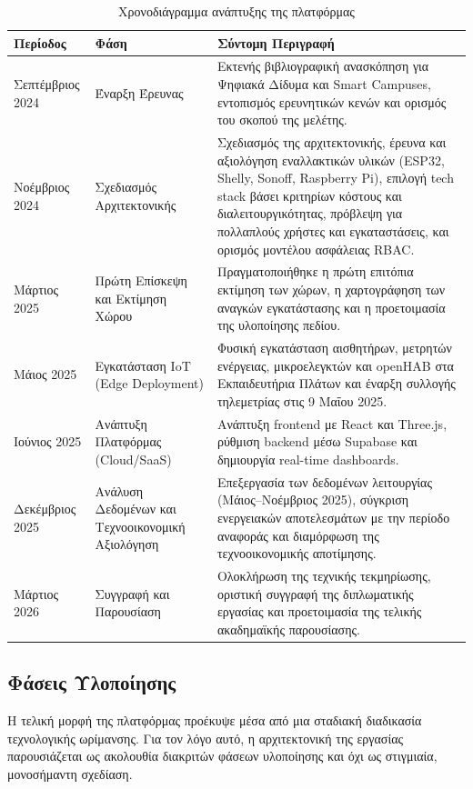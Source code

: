 \begin{table}[htbp]
\centering
\small
\setlength{\tabcolsep}{4pt}
\renewcommand{\arraystretch}{1.15}
\caption{Χρονοδιάγραμμα ανάπτυξης της πλατφόρμας}
\label{tab:timeline_ch3}
\begin{tabular}{|p{}|p{}|p{}|}
\hline
\textbf{Περίοδος} & \textbf{Φάση} & \textbf{Σύντομη Περιγραφή} \\
\hline
Σεπτέμβριος 2024 & Έναρξη Έρευνας & Εκτενής βιβλιογραφική ανασκόπηση για Ψηφιακά Δίδυμα και \textlatin{Smart Campuses}, εντοπισμός ερευνητικών κενών και ορισμός του σκοπού της μελέτης. \\
\hline
Νοέμβριος 2024 & Σχεδιασμός Αρχιτεκτονικής & Σχεδιασμός της αρχιτεκτονικής, έρευνα και αξιολόγηση εναλλακτικών υλικών (\textlatin{ESP32, Shelly, Sonoff, Raspberry Pi}), επιλογή \textlatin{tech stack} βάσει κριτηρίων κόστους και διαλειτουργικότητας, πρόβλεψη για πολλαπλούς χρήστες και εγκαταστάσεις, και ορισμός μοντέλου ασφάλειας \textlatin{RBAC}. \\
\hline
Μάρτιος 2025 & Πρώτη Επίσκεψη και Εκτίμηση Χώρου & Πραγματοποιήθηκε η πρώτη επιτόπια εκτίμηση των χώρων, η χαρτογράφηση των αναγκών εγκατάστασης και η προετοιμασία της υλοποίησης πεδίου. \\
\hline
Μάιος 2025 & Εγκατάσταση \textlatin{IoT} (\textlatin{Edge Deployment}) & Φυσική εγκατάσταση αισθητήρων, μετρητών ενέργειας, μικροελεγκτών και \textlatin{openHAB} στα Εκπαιδευτήρια Πλάτων και έναρξη συλλογής τηλεμετρίας στις 9 Μαΐου 2025. \\
\hline
Ιούνιος 2025 & Ανάπτυξη Πλατφόρμας (\textlatin{Cloud/SaaS}) & Ανάπτυξη \textlatin{frontend} με \textlatin{React} και \textlatin{Three.js}, ρύθμιση \textlatin{backend} μέσω \textlatin{Supabase} και δημιουργία \textlatin{real-time dashboards}. \\
\hline
Δεκέμβριος 2025 & Ανάλυση Δεδομένων και Τεχνοοικονομική Αξιολόγηση & Επεξεργασία των δεδομένων λειτουργίας (Μάιος--Νοέμβριος 2025), σύγκριση ενεργειακών αποτελεσμάτων με την περίοδο αναφοράς και διαμόρφωση της τεχνοοικονομικής αποτίμησης. \\
\hline
Μάρτιος 2026 & Συγγραφή και Παρουσίαση & Ολοκλήρωση της τεχνικής τεκμηρίωσης, οριστική συγγραφή της διπλωματικής εργασίας και προετοιμασία της τελικής ακαδημαϊκής παρουσίασης. \\
\hline
\end{tabular}
\end{table}

\subsection{Φάσεις Υλοποίησης}
Η τελική μορφή της πλατφόρμας προέκυψε μέσα από μια σταδιακή διαδικασία τεχνολογικής ωρίμανσης. Για τον λόγο αυτό, η αρχιτεκτονική της εργασίας παρουσιάζεται ως ακολουθία διακριτών φάσεων υλοποίησης και όχι ως στιγμιαία, μονοσήμαντη σχεδίαση.

